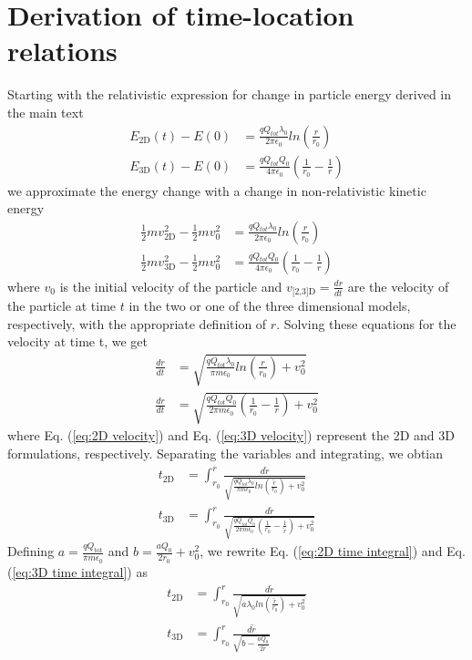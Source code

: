 \documentclass[aps,prl,twocolumn,showpacs,superscriptaddress,groupedaddress]{revtex4-1}  %
\begin{document}
\section{Derivation of time-location relations}
Starting with the relativistic expression for change in particle energy derived in the main text
\begin{align}
  E_\text{2D}(t) - E(0) &= \frac{q Q_{tot} \lambda_0}{2 \pi \epsilon_0} ln\left(\frac{r}{r_0}\right)\label{eq:2D energy}\\
  E_\text{3D}(t) - E(0) &= \frac{q Q_{tot} Q_0}{4 \pi \epsilon_0} \left(\frac{1}{r_0} - \frac{1}{r}\right)\label{eq:3D energy}
\end{align}
we approximate the energy change with a change in non-relativistic kinetic energy
\begin{align}
  \frac{1}{2} m v_\text{2D}^2 - \frac{1}{2} m v_0^2 &= \frac{q Q_{tot} \lambda_0}{2 \pi \epsilon_0} ln\left(\frac{r}{r_0}\right)\label{eq:2D kinetic energy}\\
   \frac{1}{2} m v_\text{3D}^2 - \frac{1}{2} m v_0^2 &= \frac{q Q_{tot} Q_0}{4 \pi \epsilon_0} \left(\frac{1}{r_0} - \frac{1}{r}\right)\label{eq:3D kinetic energy}
\end{align}
where $v_0$ is the initial velocity of the particle and $v_\text{[2,3]D} = \frac{d r}{dt}$ are the velocity of the particle at time $t$ in the two or one of the three dimensional
models, respectively, with the appropriate definition of $r$.  Solving these equations for the velocity at time t, we get
\begin{align}
  \frac{d r}{d t} &= \sqrt{\frac{q Q_{tot} \lambda_0}{\pi m \epsilon_0} ln\left(\frac{r}{r_0}\right) + v_0^2}\label{eq:2D velocity}\\
  \frac{d r}{d t} &= \sqrt{\frac{q Q_{tot} Q_0}{2 \pi m \epsilon_0} \left(\frac{1}{r_0} - \frac{1}{r }\right) + v_0^2}\label{eq:3D velocity}
\end{align}
where Eq. (\ref{eq:2D velocity}) and Eq. (\ref{eq:3D velocity}) represent the 2D and 3D formulations, respectively.  
Separating the variables and integrating, we obtian
\begin{align}
  t_\text{2D} &= \int_{r_0}^{r} \frac{d\tilde{r}}{ \sqrt{\frac{q Q_{tot} \lambda_0}{\pi m \epsilon_0} ln\left(\frac{\tilde{r}}{r_0}\right) + v_0^2}}\label{eq:2D time integral}\\
  t_\text{3D} &= \int_{r_0}^{r} \frac{d\tilde{r}}{\sqrt{\frac{q Q_{tot} Q_0}{2 \pi m \epsilon_0} \left(\frac{1}{r_0} - \frac{1}{\tilde{r}}\right)+v_0^2}}\label{eq:3D time integral}
\end{align}
Defining
$a = \frac{q Q_\text{tot}}{\pi m \epsilon_0}$ and $b = \frac{a Q_0}{2 r_0} + v_0^2$, we rewrite Eq. (\ref{eq:2D time integral}) and Eq. (\ref{eq:3D time integral})
as
\begin{align}
  t_\text{2D} &= \int_{r_0}^{r} \frac{d\tilde{r}}{ \sqrt{a \lambda_0 ln\left(\frac{\tilde{r}}{r_0}\right) + v_0^2}}\label{eq:2D time integral subbed}\\
  t_\text{3D} &= \int_{r_0}^{r} \frac{d\tilde{r}}{\sqrt{b - \frac{a Q_0}{2 \tilde{r} }}}\label{eq:3D time integral subbed}
\end{align} 
\end{document}
